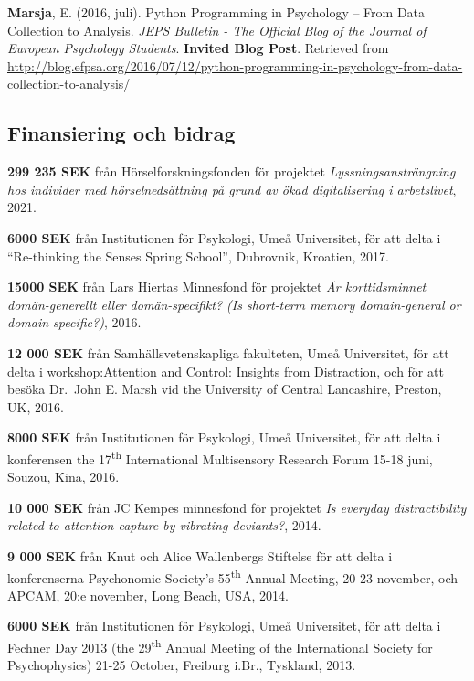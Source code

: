 \documentclass[]{article}
\begin{document}
\textbf{Marsja}, E. (2016, juli). Python Programming in Psychology --
From Data Collection to Analysis. \emph{JEPS Bulletin - The Official
Blog of the Journal of European Psychology Students}. \textbf{Invited
Blog Post}. Retrieved from \sloppy
\url{http://blog.efpsa.org/2016/07/12/python-programming-in-psychology-from-data-collection-to-analysis/}

\hypertarget{finansiering-och-bidrag}{%
\subsection{Finansiering och bidrag}\label{finansiering-och-bidrag}}

\textbf{299 235 SEK} från Hörselforskningsfonden för projektet
\emph{Lyssningsansträngning hos individer med hörselnedsättning på grund
av ökad digitalisering i arbetslivet}, 2021.

\textbf{6000 SEK} från Institutionen för Psykologi, Umeå Universitet,
för att delta i ``Re-thinking the Senses Spring School'', Dubrovnik,
Kroatien, 2017.

\textbf{15000 SEK} från Lars Hiertas Minnesfond för projektet \emph{Är
korttidsminnet domän-generellt eller domän-specifikt? (Is short-term
memory domain-general or domain specific?)}, 2016.

\textbf{12 000 SEK} från Samhällsvetenskapliga fakulteten, Umeå
Universitet, för att delta i workshop:Attention and Control: Insights
from Distraction, och för att besöka Dr.~John E. Marsh vid the
University of Central Lancashire, Preston, UK, 2016.

\textbf{8000 SEK} från Institutionen för Psykologi, Umeå Universitet,
för att delta i konferensen the 17\textsuperscript{th} International
Multisensory Research Forum 15-18 juni, Souzou, Kina, 2016.

\textbf{10 000 SEK} från JC Kempes minnesfond för projektet \emph{Is
everyday distractibility related to attention capture by vibrating
deviants?}, 2014.

\textbf{9 000 SEK} från Knut och Alice Wallenbergs Stiftelse för att
delta i konferenserna Psychonomic Society's 55\textsuperscript{th}
Annual Meeting, 20-23 november, och APCAM, 20:e november, Long Beach,
USA, 2014.

\textbf{6000 SEK} från Institutionen för Psykologi, Umeå Universitet,
för att delta i Fechner Day 2013 (the 29\textsuperscript{th} Annual
Meeting of the International Society for Psychophysics) 21-25 October,
Freiburg i.Br., Tyskland, 2013.
\end{document}
